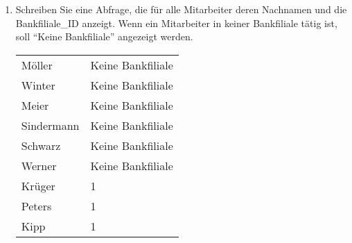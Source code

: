 \begin{enumerate}
\begin{center}
\begin{small}
\begin{msoraclesql}
\begin{supertabular}{rll}
              \end{supertabular}
            \end{msoraclesql}
          \end{small}
        \end{center}
        \item Schreiben Sie eine Abfrage, die f\"ur alle Mitarbeiter deren
        Nachnamen und die Bankfiliale\_ID anzeigt. Wenn ein Mitarbeiter in
        keiner Bankfiliale t\"atig ist, soll \enquote{Keine Bankfiliale}
        angezeigt werden.
        \begin{center}
          \begin{small}
            \tablehead{}
            \tabletail {
            }
            \begin{msoraclesql}
              \begin{supertabular}{ll}
                M\"oller & Keine Bankfiliale \\
                Winter & Keine Bankfiliale \\
                Meier & Keine Bankfiliale \\
                Sindermann & Keine Bankfiliale \\
                Schwarz & Keine Bankfiliale \\
                Werner & Keine Bankfiliale \\
                Kr\"uger & 1 \\
                Peters & 1 \\
                Kipp & 1 \\
              \end{supertabular}
            \end{msoraclesql}
          \end{small}
        \end{center}
      \end{enumerate}
